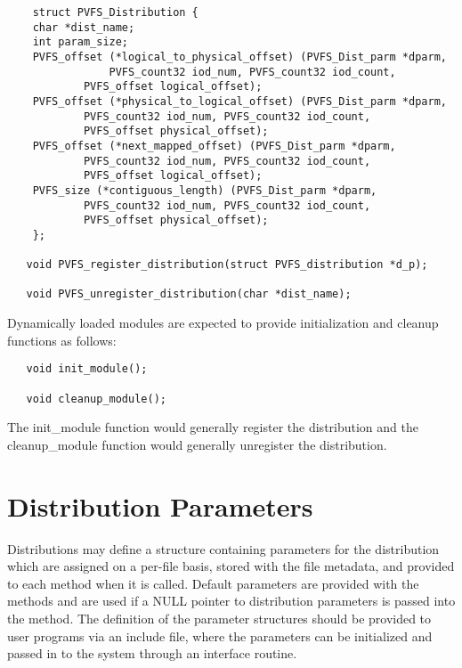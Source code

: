 \documentclass[11pt]{article}
\begin{document}
\begin{verbatim}
	struct PVFS_Distribution {
   	char *dist_name;
   	int param_size;
   	PVFS_offset (*logical_to_physical_offset) (PVFS_Dist_parm *dparm,
        		PVFS_count32 iod_num, PVFS_count32 iod_count,
         	PVFS_offset logical_offset);
   	PVFS_offset (*physical_to_logical_offset) (PVFS_Dist_parm *dparm,
         	PVFS_count32 iod_num, PVFS_count32 iod_count,
         	PVFS_offset physical_offset);
   	PVFS_offset (*next_mapped_offset) (PVFS_Dist_parm *dparm,
         	PVFS_count32 iod_num, PVFS_count32 iod_count,
         	PVFS_offset logical_offset);
   	PVFS_size (*contiguous_length) (PVFS_Dist_parm *dparm,
         	PVFS_count32 iod_num, PVFS_count32 iod_count,
         	PVFS_offset physical_offset);
	};

   void PVFS_register_distribution(struct PVFS_distribution *d_p);

   void PVFS_unregister_distribution(char *dist_name);
\end{verbatim}

Dynamically loaded modules are expected to provide initialization and
cleanup functions as follows:

\begin{verbatim}
   void init_module();

   void cleanup_module();
\end{verbatim}

The init\_module function would generally register the distribution and
the cleanup\_module function would generally unregister the
distribution.

\section{Distribution Parameters}

Distributions may define a structure containing parameters for the
distribution which are assigned on a per-file basis, stored with the
file metadata, and provided to each method when it is called.  Default
parameters are provided with the methods and are used if a NULL pointer
to distribution parameters is passed into the method.  The definition of
the parameter structures should be provided to user programs via an
include file, where the parameters can be initialized and passed in to
the system through an interface routine.
\end{document}
